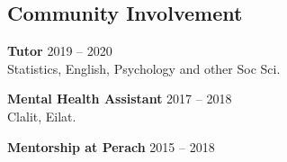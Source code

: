 \documentclass[
	12pt,a4paper %
]{article}
\begin{document}
\begin{paracol}{2}
 \section{Community Involvement}
 
 \textbf{Tutor} \hfill 2019 -- 2020 \\
  Statistics, English, Psychology and other Soc Sci.

 \textbf{Mental Health Assistant} \hfill 2017 -- 2018 \\
 Clalit, Eilat.

 \textbf{Mentorship at Perach} \hfill 2015 -- 2018
\end{paracol} %
\end{document}

